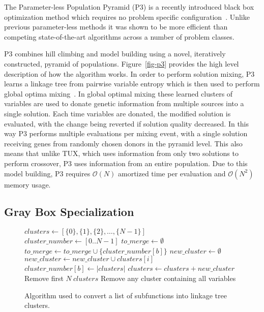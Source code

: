 \documentclass{sig-alternate}
\newcommand{\BigO}[1]{$\mathcal{O}{(#1)}$}
\begin{document}
The Parameter-less Population Pyramid (P3) is a recently introduced
black box optimization method which requires no problem specific configuration~\cite{goldman:2014:p3}.
Unlike previous parameter-less methods it was shown to be more efficient than
competing state-of-the-art algorithms across a number of problem classes.

P3 combines hill climbing and model building using a novel, iteratively constructed, pyramid
of populations. Figure~\ref{fig-p3} provides the high level description of how the algorithm
works. In order to perform solution mixing, P3 learns a linkage tree from pairwise variable
entropy which is then used to perform global optima mixing~\cite{thierens:2011:gomea}. In global
optimal mixing these learned clusters of variables are used to donate genetic information from multiple
sources into a single solution. Each time variables are donated, the modified solution is evaluated,
with the change being reverted if solution quality decreased. In this way P3 performs
multiple evaluations per mixing event, with a single solution receiving genes from randomly chosen
donors in the pyramid level. This also means that unlike TUX, which uses information from only two
solutions to perform crossover, P3 uses information from an entire population.
Due to this model building, P3 requires \BigO{N} amortized time per evaluation and \BigO{N^2}
memory usage.

\subsection{Gray Box Specialization}
\begin{figure}
  \begin{algorithmic}[1]
    \State $clusters \leftarrow [\{0\}, \{1\}, \{2\}, \dots, \{N-1\}]$
    \State $cluster\_number \leftarrow [0 .. N-1]$
      \State $to\_merge \leftarrow \emptyset$
        \State $to\_merge \leftarrow to\_merge \cup \{cluster\_number[b]\}$
      \EndFor
        \State $new\_cluster \leftarrow \emptyset$
          \State $new\_cluster \leftarrow new\_cluster \cup clusters[i]$
        \EndFor
          \State $cluster\_number[b] \leftarrow |clusters|$
        \EndFor
        \State $clusters \leftarrow clusters + new\_cluster$
      \EndIf
    \EndFor
    \State Remove first $N~clusters$
    \State Remove any cluster containing all variables
  \EndProcedure
\end{algorithmic}
  \caption{Algorithm used to convert a list of subfunctions into linkage tree clusters.}
  \label{fig-sfx-tree}
\end{figure}
\end{document}
